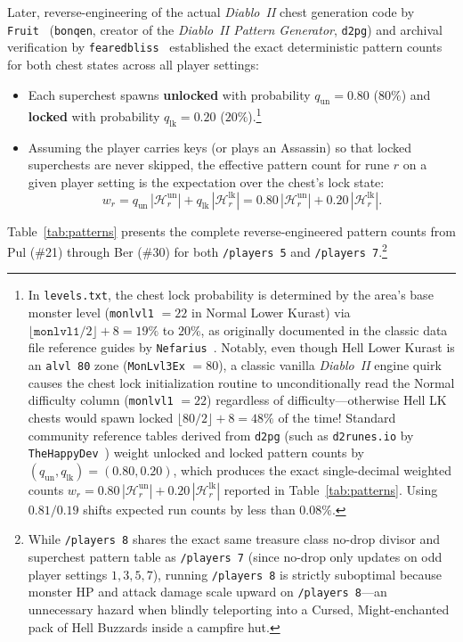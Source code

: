 \documentclass[11pt,reqno]{amsart}
\theoremstyle{definition}
\begin{document}
Later, reverse-engineering of the actual \emph{Diablo~II} chest generation code by \texttt{Fruit}~\cite{fruit_d2pg} (\texttt{bonqen}, creator of the \emph{Diablo~II Pattern Generator}, \texttt{d2pg}) and archival verification by \texttt{fearedbliss}~\cite{fearedbliss_lk} established the exact deterministic pattern counts for both chest states across all player settings:
\begin{itemize}
    \item Each superchest spawns \textbf{unlocked} with probability $q_{\text{un}} = 0.80$ ($80\%$) and \textbf{locked} with probability $q_{\text{lk}} = 0.20$ ($20\%$).\footnote{In \texttt{levels.txt}, the chest lock probability is determined by the area's base monster level (\texttt{monlvl1} $= 22$ in Normal Lower Kurast) via $\lfloor\texttt{monlvl1}/2\rfloor + 8 = 19\%$ to $20\%$, as originally documented in the classic data file reference guides by \texttt{Nefarius}~\cite{nefarius_levels}. Notably, even though Hell Lower Kurast is an \texttt{alvl~80} zone (\texttt{MonLvl3Ex} $= 80$), a classic vanilla \emph{Diablo~II} engine quirk causes the chest lock initialization routine to unconditionally read the Normal difficulty column (\texttt{monlvl1} $= 22$) regardless of difficulty—otherwise Hell LK chests would spawn locked $\lfloor 80/2 \rfloor + 8 = 48\%$ of the time! Standard community reference tables derived from \texttt{d2pg} (such as \texttt{d2runes.io} by \texttt{TheHappyDev}~\cite{thehappydev_d2runes}) weight unlocked and locked pattern counts by $(q_{\text{un}}, q_{\text{lk}}) = (0.80, 0.20)$, which produces the exact single-decimal weighted counts $w_r = 0.80\,|\mathcal{H}_r^{\text{un}}| + 0.20\,|\mathcal{H}_r^{\text{lk}}|$ reported in Table~\ref{tab:patterns}. Using $0.81/0.19$ shifts expected run counts by less than $0.08\%$.}
    \item Assuming the player carries keys (or plays an Assassin) so that locked superchests are never skipped, the effective pattern count for rune $r$ on a given player setting is the expectation over the chest's lock state:
    \begin{equation}
    \label{eq:weighted_pat}
        w_r = q_{\text{un}}\,|\mathcal{H}_r^{\text{un}}| + q_{\text{lk}}\,|\mathcal{H}_r^{\text{lk}}| = 0.80\,|\mathcal{H}_r^{\text{un}}| + 0.20\,|\mathcal{H}_r^{\text{lk}}|.
    \end{equation}
\end{itemize}

Table~\ref{tab:patterns} presents the complete reverse-engineered pattern counts from Pul (\#21) through Ber (\#30) for both \texttt{/players~5} and \texttt{/players~7}.\footnote{While \texttt{/players~8} shares the exact same treasure class no-drop divisor and superchest pattern table as \texttt{/players~7} (since no-drop only updates on odd player settings $1, 3, 5, 7$), running \texttt{/players~8} is strictly suboptimal because monster HP and attack damage scale upward on \texttt{/players~8}—an unnecessary hazard when blindly teleporting into a Cursed, Might-enchanted pack of Hell Buzzards inside a campfire hut.}
\end{document}
